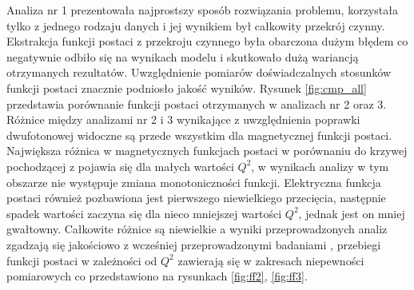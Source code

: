 \documentclass[11pt]{book}
\theoremstyle{definition}
\begin{document}
Analiza nr 1 prezentowała najprostszy sposób rozwiązania problemu, korzystała tylko z jednego rodzaju danych i jej wynikiem był całkowity przekrój czynny. Ekstrakcja funkcji postaci z przekroju czynnego była obarczona dużym błędem co negatywnie odbiło się na wynikach modelu i skutkowało dużą wariancją otrzymanych rezultatów. Uwzględnienie pomiarów doświadczalnych stosunków funkcji postaci znacznie podniosło jakość wyników. Rysunek \ref{fig:cmp_all} przedstawia porównanie funkcji postaci otrzymanych w analizach nr 2 oraz 3. Różnice między analizami nr 2 i 3 wynikające z uwzględnienia poprawki dwufotonowej widoczne są przede wszystkim dla magnetycznej funkcji postaci. Największa różnica w magnetycznych funkcjach postaci w porównaniu do krzywej pochodzącej z \cite{2009PhRvC..79f5204A} pojawia się dla małych wartości $Q^2$, w wynikach analizy w tym obszarze nie występuje zmiana monotoniczności funkcji. Elektryczna funkcja postaci również pozbawiona jest pierwszego niewielkiego przecięcia, następnie spadek wartości zaczyna się dla nieco mniejszej wartości $Q^2$, jednak jest on mniej gwałtowny. Całkowite różnice są niewielkie a wyniki przeprowadzonych analiz zgadzają się jakościowo z wcześniej przeprowadzonymi badaniami \cite{2009PhRvC..79f5204A}, przebiegi funkcji postaci w zależności od $Q^2$ zawierają się w zakresach niepewności pomiarowych co przedstawiono na rysunkach \ref{fig:ff2}, \ref{fig:ff3}.




\end{document}
